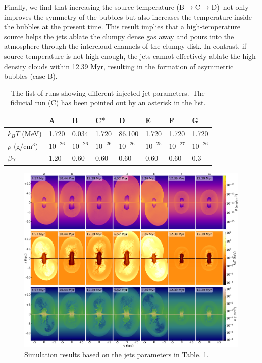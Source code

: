 \documentclass[fleqn,usenatbib,useAMS]{mnras}
\begin{document}
Finally, we find that increasing the source temperature (B$\rightarrow$C$\rightarrow$D)\
not only improves the symmetry of the bubbles but also increases the temperature
inside the bubbles at the present time. This result implies that a high-temperature source
helps the jets ablate the clumpy dense gas away and pours into the atmosphere
through the intercloud channels of the clumpy disk. In contrast,
if source temperature is not high enough,
the jets cannot effectively ablate the high-density clouds within 12.39 Myr,
resulting in the formation of asymmetric bubbles (case B).


\begin{table}
\raggedright
\caption{The list of runs showing different injected jet parameters.\
         The fiducial run (C) has been pointed out by an asterisk in the list. }
\label{tablb-jet-parameters}
\begin{tabular}{@{}llllllll@{}}
\toprule[1pt]\midrule[0.3pt]
                  & A          & B          & C*         & D           & E          & F          & G          \\ \midrule
$k_{B}T$ (MeV)    & 1.720      & 0.034      & 1.720      & 86.100      & 1.720      & 1.720      & 1.720      \\
$\rho$ (g/cm$^3$) & $10^{-26}$ & $10^{-26}$ & $10^{-26}$ & $10^{-26}$  & $10^{-25}$ & $10^{-27}$ & $10^{-26}$ \\
$\beta\gamma$     & 1.20       & 0.60       & 0.60       & 0.60        & 0.60       & 0.60       & 0.3        \\ \midrule
\end{tabular}
\end{table}



\begin{figure}
  \includegraphics[width=\textwidth]{figures/fig__slice-compare.png}
  \caption
   {
    Simulation results based on the jets parameters in Table. \ref{tablb-jet-parameters}.
   }
  \label{fig__slice-compare}
\end{figure}


\end{document}
